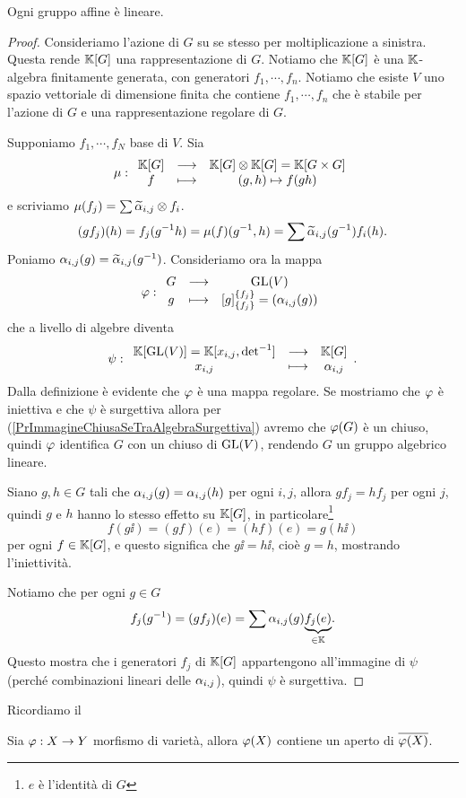 \begin{theorem}
Ogni gruppo affine \`e lineare.
\end{theorem}
\begin{proof}
Consideriamo l'azione di $G$ su se stesso per moltiplicazione a sinistra. Questa rende $\mathbb{K}[G]$ una rappresentazione di $G$. Notiamo che $\mathbb{K}[G]$ \`e una $\mathbb{K}$-algebra finitamente generata, con generatori $f_1,\cdots, f_n$. Notiamo che esiste $V$ uno spazio vettoriale di dimensione finita che contiene $f_1,\cdots, f_n$ che \`e stabile per l'azione di $G$ e una rappresentazione regolare di $G$.

Supponiamo $f_1,\cdots, f_N$ base di $V$. Sia
\[\mu:\begin{array}{ccc} {\mathbb{K}[G]} & \longrightarrow & {\mathbb{K}[G]\otimes\mathbb{K}[G]=\mathbb{K}[G\times G]}\\ {f} & \longmapsto & {(g,h)\mapsto f(gh)} \end{array}\]
e scriviamo $\mu(f_j)=\sum \widetilde{\alpha}_{i,j}\otimes f_i$.
\[(g f_j)(h)=f_j(g^{-1} h)=\mu(f)(g^{-1},h)=\sum \widetilde{\alpha}_{i,j}(g^{-1})f_i(h).\]
Poniamo $\alpha_{i,j}(g)=\widetilde{\alpha}_{i,j}(g^{-1})$.
Consideriamo ora la mappa
\[\varphi:\begin{array}{ccc} {G} & \longrightarrow & {\mathrm{GL}(V)}\\ {g} & \longmapsto & {[g]^{\left\{{f_j}\right\}}_{\left\{{f_j}\right\}}=(\alpha_{i,j}(g))} \end{array}\]
che a livello di algebre diventa
\[\psi:\begin{array}{ccc} {\mathbb{K}[\mathrm{GL}(V)]=\mathbb{K}[x_{i,j},\det^{-1}]} & \longrightarrow & {\mathbb{K}[G]}\\ {x_{i,j}} & \longmapsto & {\alpha_{i,j}} \end{array}.\]
Dalla definizione \`e evidente che $\varphi$ \`e una mappa regolare. Se mostriamo che $\varphi$ \`e iniettiva e che $\psi$ \`e surgettiva allora per (\ref{PrImmagineChiusaSeTraAlgebraSurgettiva}) avremo che $\varphi(G)$ \`e un chiuso, quindi $\varphi$ identifica $G$ con un chiuso di $\mathrm{GL}(V)$, rendendo $G$ un gruppo algebrico lineare.

Siano $g, h\in G$ tali che $\alpha_{i,j}(g)=\alpha_{i,j}(h)$ per ogni $i,j$, allora $gf_j=hf_j$ per ogni $j$, quindi $g$ e $h$ hanno lo stesso effetto su $\mathbb{K}[G]$, in particolare\footnote{$e$ \`e l'identit\`a di $G$}
\[f(g\ii)=(gf)(e)=(hf)(e)=g(h\ii)\]
per ogni $f\in\mathbb{K}[G]$, e questo significa che $g\ii=h\ii$, cio\`e $g=h$, mostrando l'iniettivit\`a.

Notiamo che per ogni $g\in G$
\[f_j(g^{-1})=(gf_j)(e)=\sum \alpha_{i,j}(g)\underset{\in\mathbb{K}}{\underbrace{f_j(e)}}.\]
Questo mostra che i generatori $f_j$ di $\mathbb{K}[G]$ appartengono all'immagine di $\psi$ (perch\'e combinazioni lineari delle $\alpha_{i,j}$), quindi $\psi$ \`e surgettiva.
\end{proof}


Ricordiamo il 
\begin{theorem}[di Chevalley]
Sia $\varphi:X\to Y$ morfismo di variet\`a, allora $\varphi(X)$ contiene un aperto di $\overline{\varphi(X)}$.
\end{theorem}

